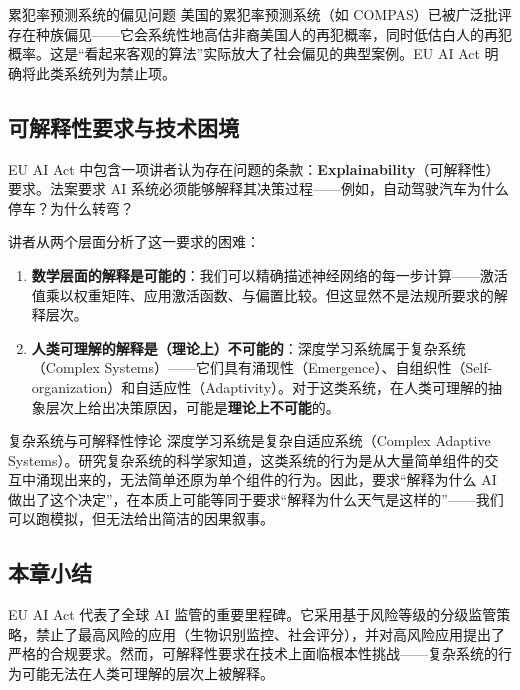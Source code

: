 \begin{warningbox}{累犯率预测系统的偏见问题}
美国的累犯率预测系统（如 COMPAS）已被广泛批评存在种族偏见——它会系统性地高估非裔美国人的再犯概率，同时低估白人的再犯概率。这是``看起来客观的算法''实际放大了社会偏见的典型案例。EU AI Act 明确将此类系统列为禁止项。
\end{warningbox}

\subsection{可解释性要求与技术困境}

EU AI Act 中包含一项讲者认为存在问题的条款：\textbf{Explainability}（可解释性）要求。法案要求 AI 系统必须能够解释其决策过程——例如，自动驾驶汽车为什么停车？为什么转弯？

讲者从两个层面分析了这一要求的困难：

\begin{enumerate}
    \item \textbf{数学层面的解释是可能的}：我们可以精确描述神经网络的每一步计算——激活值乘以权重矩阵、应用激活函数、与偏置比较。但这显然不是法规所要求的解释层次。
    \item \textbf{人类可理解的解释是（理论上）不可能的}：深度学习系统属于复杂系统（Complex Systems）——它们具有涌现性（Emergence）、自组织性（Self-organization）和自适应性（Adaptivity）。对于这类系统，在人类可理解的抽象层次上给出决策原因，可能是\textbf{理论上不可能}的。
\end{enumerate}

\begin{importantbox}{复杂系统与可解释性悖论}
深度学习系统是复杂自适应系统（Complex Adaptive Systems）。研究复杂系统的科学家知道，这类系统的行为是从大量简单组件的交互中涌现出来的，无法简单还原为单个组件的行为。因此，要求``解释为什么 AI 做出了这个决定''，在本质上可能等同于要求``解释为什么天气是这样的''——我们可以跑模拟，但无法给出简洁的因果叙事。
\end{importantbox}

\subsection{本章小结}

EU AI Act 代表了全球 AI 监管的重要里程碑。它采用基于风险等级的分级监管策略，禁止了最高风险的应用（生物识别监控、社会评分），并对高风险应用提出了严格的合规要求。然而，可解释性要求在技术上面临根本性挑战——复杂系统的行为可能无法在人类可理解的层次上被解释。

